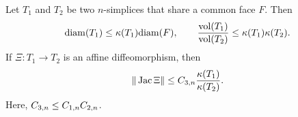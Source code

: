\documentclass[12pt,a4paper]{article}
\begin{document}
\begin{lemma}\label{lemma:volumecomparison}
    Let $T_1$ and $T_2$ be two $n$-simplices that share a common face $F$. Then 
    \begin{align*}
        {\operatorname{diam}}(T_1)
        \leq 
        \kappa(T_1)
        {\operatorname{diam}}(F)
        ,
        \qquad 
        \frac{ \operatorname{vol}(T_1) }{ \operatorname{vol}(T_2) }
        \leq 
        \kappa(T_1) \kappa(T_2)
        .
    \end{align*}
    If $\Xi : T_1 \rightarrow T_2$ is an affine diffeomorphism, then 
    \begin{align*}
        \| \operatorname{{\rm Jac}} \Xi \|
        \leq 
        C_{3,n}
        \frac{ \kappa(T_1) }{ \kappa(T_2) }
        .
    \end{align*}
    Here, $C_{3,n} \leq C_{1,n} C_{2,n}$. 
\end{lemma}

    

\end{document}
